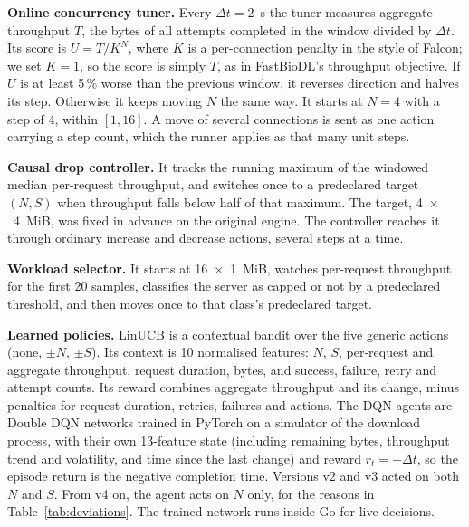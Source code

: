 \textbf{Online concurrency tuner.} Every $\Delta t = 2$~s the tuner measures aggregate throughput $T$, the bytes of all attempts completed in the window divided by $\Delta t$. Its score is $U = T/K^{N}$, where $K$ is a per-connection penalty in the style of Falcon; we set $K = 1$, so the score is simply $T$, as in FastBioDL's throughput objective. If $U$ is at least 5\,\% worse than the previous window, it reverses direction and halves its step. Otherwise it keeps moving $N$ the same way. It starts at $N = 4$ with a step of 4, within $[1, 16]$. A move of several connections is sent as one action carrying a step count, which the runner applies as that many unit steps.

\textbf{Causal drop controller.} It tracks the running maximum of the windowed median per-request throughput, and switches once to a predeclared target $(N, S)$ when throughput falls below half of that maximum. The target, 4~$\times$~4~MiB, was fixed in advance on the original engine. The controller reaches it through ordinary increase and decrease actions, several steps at a time.

\textbf{Workload selector.} It starts at 16~$\times$~1~MiB, watches per-request throughput for the first 20 samples, classifies the server as capped or not by a predeclared threshold, and then moves once to that class's predeclared target.

\textbf{Learned policies.} LinUCB is a contextual bandit over the five generic actions (none, $\pm N$, $\pm S$). Its context is 10 normalised features: $N$, $S$, per-request and aggregate throughput, request duration, bytes, and success, failure, retry and attempt counts. Its reward combines aggregate throughput and its change, minus penalties for request duration, retries, failures and actions. The DQN agents are Double DQN networks trained in PyTorch on a simulator of the download process, with their own 13-feature state (including remaining bytes, throughput trend and volatility, and time since the last change) and reward $r_t = -\Delta t$, so the episode return is the negative completion time. Versions v2 and v3 acted on both $N$ and $S$. From v4 on, the agent acts on $N$ only, for the reasons in Table~\ref{tab:deviations}. The trained network runs inside Go for live decisions.

